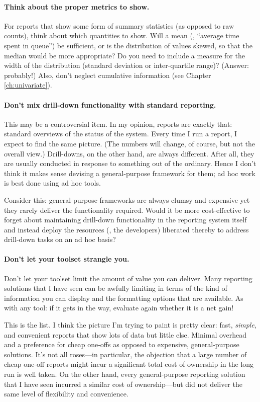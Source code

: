 \paragraph{Think about the proper metrics to show.}
For reports that show some form of summary statistics (as opposed to
raw counts), think about which quantities to show. Will a mean (\eg,
``average time spent in queue'') be sufficient, or is the distribution
of values skewed, so that the median would be more appropriate?  Do
you need to include a measure for the width of the distribution
(standard deviation or inter-quartile range)? (Answer: probably!)
Also, don't neglect cumulative information (see Chapter
\ref{ch:univariate}).
 
\paragraph{Don't mix drill-down functionality with standard reporting.}
This may be a controversial item. In my opinion, reports are exactly
that: standard overviews of the status of the system.  Every time I
run a report, I expect to find the same picture. (The numbers will
change, of course, but not the overall view.)  Drill-downs, on the
other hand, are always different.  After all, they are usually
conducted in response to something out of the ordinary.  Hence I don't
think it makes sense devising a general-purpose framework for them; ad
hoc work is best done using ad hoc tools.

Consider this: general-purpose frameworks are always clumsy and
expensive yet they rarely deliver the functionality required.  Would
it be more cost-effective to forget about maintaining drill-down
functionality in the reporting system itself and instead deploy the
resources (\ie, the developers) liberated thereby to address
drill-down tasks on an ad hoc basis?

\paragraph{Don't let your toolset strangle you.}
Don't let your toolset limit the amount of value you can deliver.
Many reporting solutions that I have seen can be awfully limiting in
terms of the kind of information you can display and the formatting
options that are available. As with any tool: if it gets in the way, evaluate again
whether it is a net gain!

This is the list. I think the picture I'm trying to paint is pretty
clear: fast, \emph{simple}, and convenient reports that show lots of
data but little else. Minimal overhead and a preference for cheap
one-offs as opposed to expensive, general-purpose solutions. It's not
all roses---in particular, the objection that a large number of cheap
one-off reports might incur a significant total cost of ownership in
the long run is well taken. On the other hand, every general-purpose
reporting solution that I have seen incurred a similar cost of
ownership---but did not deliver the same level of flexibility and
convenience.

